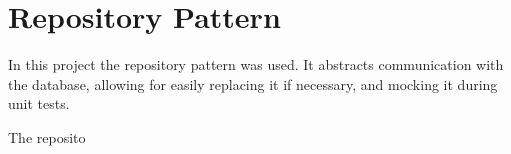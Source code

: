 \section{Repository Pattern}
In this project the repository pattern was used. It abstracts communication with the database, allowing for easily replacing it if necessary, and mocking it during unit tests.

The reposito

